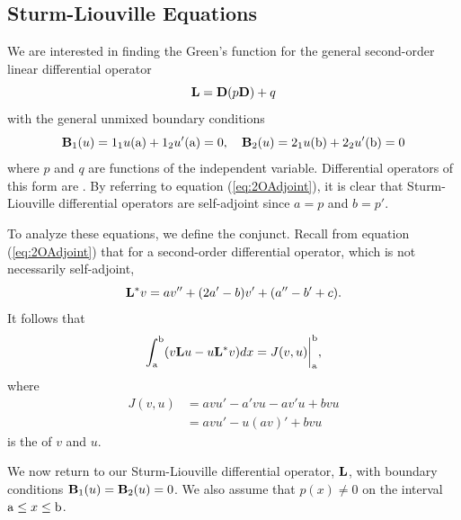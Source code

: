 \subsection{Sturm-Liouville Equations}
    We are interested in finding the Green's function for the general second-order linear differential operator
    \begin{equation}
        \mathrm{\bf{L}} = \mathrm{\bf{D}}(p\mathrm{\bf{D}})+q
    \end{equation}
    with the general unmixed boundary conditions
    \begin{equation*}
        \mathrm{\bf{B}}_1(u) =1_{1}u(\mathrm{a})+1_{2}u'(\mathrm{a}) = 0,\quad \mathrm{\bf{B}}_2(u) = 2_{1}u(\mathrm{b})+2_{2}u'(\mathrm{b}) = 0
    \end{equation*}
    where \(p\) and \(q\) are functions of the independent variable. Differential operators of this form are . By referring to equation (\ref{eq:2OAdjoint}), it is clear that Sturm-Liouville differential operators are self-adjoint since \(a=p\) and \(b=p'\). 

    To analyze these equations, we define the conjunct. Recall from equation (\ref{eq:2OAdjoint}) that for a second-order differential operator, which is not necessarily self-adjoint,
    \begin{equation*}
        \mathrm{\bf{L^*}} v = av''+(2a'-b)v'+(a''-b'+c).
    \end{equation*}
    It follows that 
    \begin{equation*}
        \int_\mathrm{a}^\mathrm{b} (v\mathrm{\bf{L}} u - u\mathrm{\bf{L^*}} v)dx = J(v,u)\biggr\rvert_{\mathrm{a}}^{\mathrm{b}},
    \end{equation*}
    where
    \begin{equation*}
        \begin{split}
            J(v,u) &= avu'-a'vu-av'u + bvu\\
            &=avu'- u(av)' +bvu
        \end{split}
    \end{equation*}
    is the  of \(v\) and \(u\).

    We now return to our Sturm-Liouville differential operator, \(\mathrm{\bf{L}}\), with boundary conditions \(\mathrm{\bf{B}}_1(u)=\mathrm{\bf{B}}_2(u)=0\). We also assume that \(p(x)\neq 0\) on the interval \(\mathrm{a} \leq x\leq \mathrm{b}\). 

